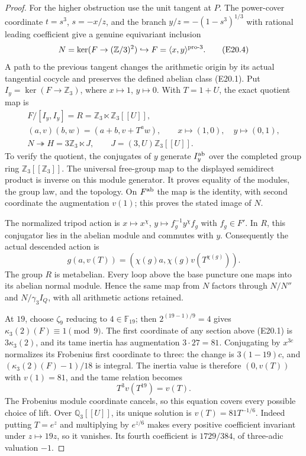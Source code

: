 \documentclass[11pt,oneside]{article}
\begin{document}
\begin{proof}
For the higher obstruction use the unit tangent
at $P$. The power-cover coordinate $t=s^3$,
$s=-x/z$, and the branch
$y/z=-(1-s^3)^{1/3}$ with rational leading
coefficient give a genuine equivariant inclusion
\[
 N=\ker(F\to(\mathbb Z/3)^2)\hookrightarrow
       F=\langle x,y\rangle^{\rm pro\text{-}3}.
 \tag{E20.4}
\]
A path to the previous tangent changes the
arithmetic origin by its actual tangential
cocycle and preserves the defined abelian
class (E20.1). Put $I_y=\ker(F\to\mathbb Z_3)$,
where $x\mapsto1$, $y\mapsto0$. With $T=1+U$,
the exact quotient map is
\[
 \begin{gathered}
 F/[I_y,I_y]=R=\mathbb Z_3\ltimes\mathbb Z_3[[U]],\\
 (a,v)(b,w)=(a+b,v+T^a w),\qquad
 x\mapsto(1,0),\quad y\mapsto(0,1),\\
 N\twoheadrightarrow H=3\mathbb Z_3\ltimes J,
            \qquad J=(3,U)\mathbb Z_3[[U]].
 \end{gathered}
 \tag{E20.5}
\]
To verify the quotient, the conjugates of $y$
generate $I_y^{\rm ab}$ over the completed
group ring $\mathbb Z_3[[\mathbb Z_3]]$.
The universal free-group map to the displayed
semidirect product is inverse on this module
generator. It proves equality of the modules,
the group law, and the topology. On
$F^{\rm ab}$ the map is the identity, with
second coordinate the augmentation $v(1)$;
this proves the stated image of $N$.

The normalized tripod action is
$x\mapsto x^\chi$, $y\mapsto f_g^{-1}y^\chi f_g$
with $f_g\in F'$. In $R$, this conjugator lies
in the abelian module and commutes with $y$.
Consequently the actual descended action is
\[
           g(a,v(T))=(\chi(g)a,\chi(g)v(T^{\chi(g)})).
 \tag{E20.6}
\]
The group $R$ is metabelian. Every loop above
the base puncture one maps into its abelian
normal module. Hence the same map from $N$
factors through $N/N''$ and $N/\gamma_3I_Q$,
with all arithmetic actions retained.

At $19$, choose $\zeta_9$ reducing to
$4\in\mathbb F_{19}$; then
$2^{(19-1)/9}=4$ gives
$\kappa_3(2)(F)\equiv1\pmod9$.
The first coordinate of any section above
(E20.1) is $3\kappa_3(2)$, and its tame inertia
has augmentation $3\cdot27=81$.
Conjugating by $x^{3c}$ normalizes its Frobenius
first coordinate to three: the change is
$3(1-19)c$, and
$(\kappa_3(2)(F)-1)/18$ is integral.
The inertia value is therefore $(0,v(T))$
with $v(1)=81$, and the tame relation becomes
\[
                         T^3v(T^{19})=v(T).
 \tag{E20.7}
\]
The Frobenius module coordinate cancels, so this
equation covers every possible choice of lift.
Over $\mathbb Q_3[[U]]$, its unique solution is
$v(T)=81T^{-1/6}$. Indeed putting $T=e^z$ and
multiplying by $e^{z/6}$ makes every positive
coefficient invariant under $z\mapsto19z$,
so it vanishes. Its fourth coefficient is
$1729/384$, of three-adic valuation $-1$.


\end{proof}
\end{document}
